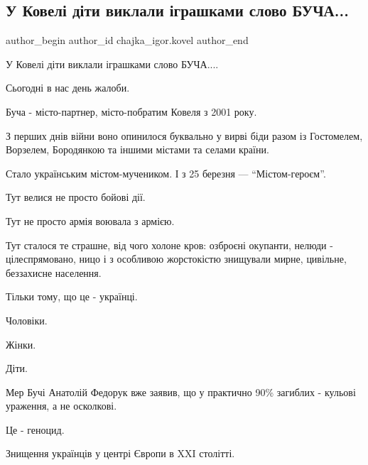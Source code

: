  
 
 
 
 
 
\subsection{У Ковелі діти виклали іграшками слово БУЧА...}
\label{sec:08_04_2022.fb.chajka_igor.kovel.1.kovel_deti_bucha}
 
\ifcmt
 author_begin
   author_id chajka_igor.kovel
 author_end
\fi

У Ковелі діти виклали іграшками слово БУЧА.... 

Сьогодні в нас день жалоби. 

Буча - місто-партнер, місто-побратим Ковеля з 2001 року. 

З перших днів війни воно опинилося буквально у вирві біди разом із Гостомелем,
Ворзелем, Бородянкою та іншими містами та селами країни. 

Стало українським містом-мучеником. І з 25 березня — \enquote{Містом-героєм}.

Тут велися не просто бойові дії. 

Тут не просто армія воювала з армією. 


Тут сталося те страшне, від чого холоне кров: озброєні окупанти, нелюди -
цілеспрямовано, ницо і з особливою жорстокістю знищували мирне,  цивільне,
беззахисне населення. 

Тільки тому, що це - українці.

Чоловіки. 

Жінки. 

Діти. 

Мер Бучі Анатолій Федорук вже заявив, що у практично 90\% загиблих -  кульові
ураження, а не осколкові.

Це - геноцид. 

Знищення українців у центрі Європи в XXI столітті. 


